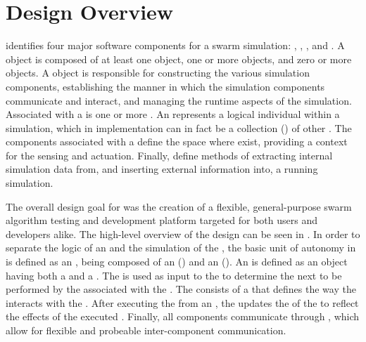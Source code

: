 \section{Design Overview}

\SWEEP{} identifies four major software components for a swarm simulation: , , , and .  A  object is composed of at least one  object, one or more  objects, and zero or more  objects. A  object is responsible for constructing the various simulation components, establishing the manner in which the simulation components communicate and interact, and managing the runtime aspects of the simulation.  Associated with a  is one or more .  An  represents a logical individual within a simulation, which in implementation can in fact be a collection () of other . The  components associated with a  define the space where  exist, providing a context for the sensing and actuation.  Finally,  define methods of extracting internal simulation data from, and inserting external information into, a running simulation.

The overall design goal for \SWEEP{} was the creation of a flexible, general-purpose swarm algorithm testing and development platform targeted for both users and developers alike. The high-level overview of the \SWEEP{} design can be seen in . In order to separate the logic of an  and the simulation of the , the basic unit of autonomy in \SWEEP{} is defined as an , being composed of an  () and an  (). An  is defined as an object having both a  and a . The  is used as input to the  to determine the next  to be performed by the  associated with the . The  consists of a  that defines the way the  interacts with the . After executing the  from an , the  updates the  of the  to reflect the effects of the executed . Finally, all \SWEEP{} components communicate through , which allow for flexible and probeable inter-component communication.

